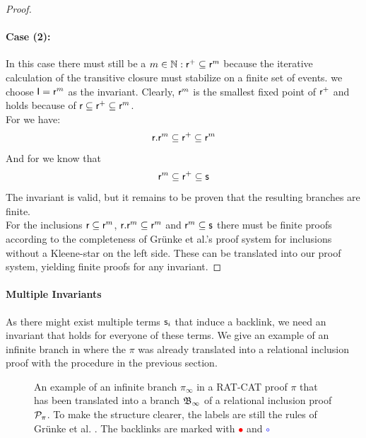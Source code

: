 \documentclass[a4paper,twoside,12pt, english]{article}
\begin{document}
\begin{proof}
\paragraph{Case (2):}
In this case there must still be a $m \in \mathbb{N}: \textsf{\upshape r}^+ \subseteq \textsf{\upshape r}^m$ because the iterative calculation of the transitive closure must stabilize on a finite set of events. we choose $\textsf{\upshape I} = \textsf{\upshape r}^m$ as the invariant. Clearly, $\textsf{\upshape r}^m$ is the smallest fixed point of $\textsf{\upshape r}^+$ and \propl{} holds because of $\textsf{\upshape r} \subseteq \textsf{\upshape r}^+ \subseteq \textsf{\upshape r}^m$. \\ 
For \propz{} we have:
\[\textsf{\upshape r}.\textsf{\upshape r}^m \subseteq \textsf{\upshape r}^+ \subseteq \textsf{\upshape r}^m\]
And for \prope{} we know that 
\[\textsf{\upshape r}^m \subseteq \textsf{\upshape r}^+ \subseteq \textsf{\upshape s}\]
The invariant is valid, but it remains to be proven that the resulting branches are finite. \\
For the inclusions $\textsf{\upshape r} \subseteq \textsf{\upshape r}^m$, $\textsf{\upshape r}.\textsf{\upshape r}^m \subseteq \textsf{\upshape r}^m$ and $\textsf{\upshape r}^m \subseteq \textsf{\upshape s}$ there must be finite proofs according to the completeness of Grünke et al.'s proof system for inclusions without a Kleene-star on the left side. These can be translated into our proof system, yielding finite proofs for any invariant.
\end{proof}

\newpage
\paragraph{Multiple Invariants}
As there might exist multiple terms $\textsf{\upshape s}_i$ that induce a backlink, we need an invariant that holds for everyone of these terms.
We give an example of an infinite branch in  where the $\pi$ was already translated into a relational inclusion proof with the procedure in the previous section.
 

\begin{figure}[h]
\begin{mathpar}
\end{mathpar}
\caption{An example of an infinite branch $\pi_\infty$ in a RAT-CAT proof $\pi$ that has been translated into a branch $\mathfrak{B}_\infty$ of a relational inclusion proof $\mathcal{P}_\pi$. To make the structure clearer, the labels are still the rules of Grünke et al. \cite{Gru+26}. The backlinks are marked with \textcolor{red}{$\bullet$} and \textcolor{blue}{$\circ$}} \label{fig:infleft}
\end{figure}
\end{document}

